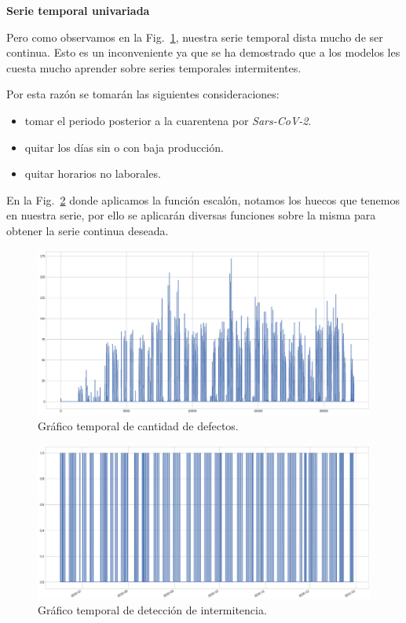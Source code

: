 \documentclass[a4paper,12pt]{article}
\begin{document}
		\clearpage				
				
		\textbf{Serie temporal univariada}
				
		Pero como observamos en la Fig.~\ref{fig:graf_cantdef_antes}, nuestra serie temporal dista mucho de ser continua. Esto es un inconveniente ya que se ha demostrado que a los modelos les cuesta mucho aprender sobre series temporales intermitentes.
				
		Por esta razón se tomarán las siguientes consideraciones:
				
		\begin{itemize}[noitemsep, topsep=2pt]
			\item tomar el periodo posterior a la cuarentena por \textit{Sars-CoV-2}.
			\item quitar los días sin o con baja producción.
			\item quitar horarios no laborales.
		\end{itemize}
				
		En la Fig.~\ref{fig:graf_inter_antes} donde aplicamos la función escalón, notamos los huecos que tenemos en nuestra serie, por ello se aplicarán diversas funciones sobre la misma para obtener la serie continua deseada.
		
		\begin{figure}[]
			\begin{center}
				\includegraphics[width=1\textwidth]{tesis_78.png}
				\caption{Gráfico temporal de cantidad de defectos.}
				\label{fig:graf_cantdef_antes}
			\end{center}
		\end{figure}
				
		\begin{figure}[]
			\begin{center}
				\includegraphics[width=1\textwidth]{tesis_79.png}
				\caption{Gráfico temporal de detección de intermitencia.}
				\label{fig:graf_inter_antes}
			\end{center}
		\end{figure}
				
\end{document}
